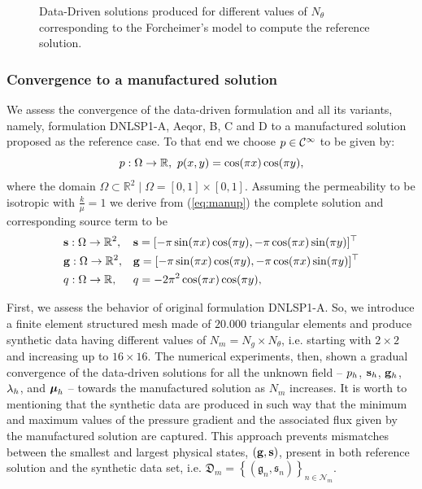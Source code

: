 \begin{figure}[ht!!]
	\begin{center}
		\caption{Data-Driven solutions produced for different values of
		$N_{\theta}$ corresponding to the Forcheimer's model
	to compute the reference solution.} \label{fig:effectNtheta}
		\fontsize{5pt}{6pt} \selectfont
		\def\svgwidth{12.5cm}
		
	\end{center}
\end{figure}

\subsubsection{Convergence to a manufactured solution}

We assess the convergence of the data-driven formulation and all its 
variants, namely, formulation DNLSP1-A, Aeqor, B, C and D to a manufactured solution proposed as the reference case. To that end we choose $ p \in \mathcal{C}^{\infty} $ to be given by:
\begin{equation}
p:\Omega \to \mathbb{R},~p(x,y) = \cos(\pi x)\cos(\pi y), \label{eq:manup}
\end{equation}
where the domain $\Omega \subset \mathbb{R}^{2} \mid \Omega = [0,1]\times[0,1]$. Assuming the permeability to be isotropic with $\frac{k}{\mu} = 1$ we derive from (\ref{eq:manup})  the complete solution and corresponding source term to be
\begin{equation*}
	\begin{aligned}
		&\mathbf{s}: \Omega \to \mathbb{R}^{2}, & &\mathbf{s} = [-\pi\sin(\pi x)\cos(\pi y), -\pi \cos(\pi x)\sin(\pi y)]^{\top} \\
		&\mathbf{g}: \Omega \to \mathbb{R}^{2}, & &\mathbf{g} = [-\pi\sin(\pi x)\cos(\pi y), -\pi \cos(\pi x)\sin(\pi y)]^{\top} \\
		&q: \Omega \to \mathbb{R}, & &q = -2\pi^{2}\cos(\pi x) \cos(\pi y),
	\end{aligned}
\end{equation*}

First, we assess the behavior of original formulation DNLSP1-A. So, we introduce a finite element structured mesh made of $20.000$ triangular elements and produce synthetic data having different values of $N_{m} = N_{g} \times N_{\theta}$, i.e. starting with $2 \times 2$ and increasing up to $16 \times 16$. The numerical experiments, then, shown a gradual convergence of the data-driven solutions for all the unknown field -- $p_h$, $\mathbf{s}_h$, $\mathbf{g}_h$, $\lambda_h$, and $\boldsymbol{\mu}_h$ -- towards the manufactured solution as $ N_{m} $ increases. It is worth to mentioning that the synthetic data are produced in such way that the minimum and maximum values of the pressure gradient and the associated flux given by the manufactured solution are captured. This approach prevents mismatches between the smallest and largest physical states, $ (\mathbf{g},\mathbf{s}) $, present in both reference solution and the synthetic data set, i.e. $ \mathfrak{D}_m = \left\lbrace\left(\mathfrak{g}_n,\mathfrak{s}_n\right)\right\rbrace_{n \in \mathcal{N}_m} $.


